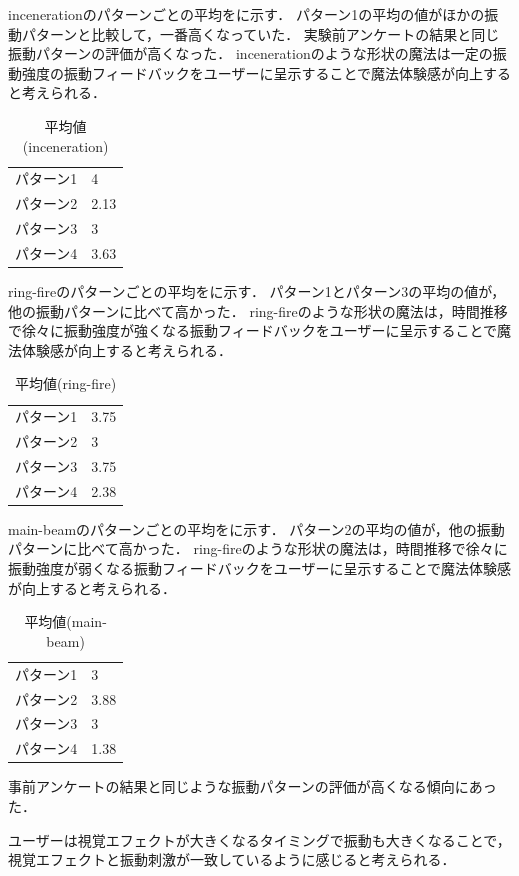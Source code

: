 incenerationのパターンごとの平均をに示す．
パターン1の平均の値がほかの振動パターンと比較して，一番高くなっていた．
実験前アンケートの結果と同じ振動パターンの評価が高くなった．
incenerationのような形状の魔法は一定の振動強度の振動フィードバックをユーザーに呈示することで魔法体験感が向上すると考えられる．

\begin{table}[h]
    \caption{平均値(inceneration)}
    \centering
    \begin{tabular}{l|l}
    \hline
    \hline
    パターン1 & 4\\
    パターン2 & 2.13\\
    パターン3 & 3\\
    パターン4 & 3.63\\
    \hline
    \end{tabular}
    \label{tab;inceAvera}
\end{table}

ring-fireのパターンごとの平均をに示す．
パターン1とパターン3の平均の値が，他の振動パターンに比べて高かった．
ring-fireのような形状の魔法は，時間推移で徐々に振動強度が強くなる振動フィードバックをユーザーに呈示することで魔法体験感が向上すると考えられる．

\begin{table}[h]
    \caption{平均値(ring-fire)}
    \centering
    \begin{tabular}{l|l}
    \hline
    \hline
    パターン1 & 3.75\\
    パターン2 & 3\\
    パターン3 & 3.75\\
    パターン4 & 2.38\\
    \hline
    \end{tabular}
    \label{tab;ringAve}
\end{table}

main-beamのパターンごとの平均をに示す．
パターン2の平均の値が，他の振動パターンに比べて高かった．
ring-fireのような形状の魔法は，時間推移で徐々に振動強度が弱くなる振動フィードバックをユーザーに呈示することで魔法体験感が向上すると考えられる．


  \begin{table}[H]
    \caption{平均値(main-beam)}
    \centering
    \begin{tabular}{l|l}
    \hline
    \hline
    パターン1 & 3\\
    パターン2 & 3.88\\
    パターン3 & 3\\
    パターン4 & 1.38\\
    \hline
    \end{tabular}
    \label{tab;mainAve}
\end{table}

事前アンケートの結果と同じような振動パターンの評価が高くなる傾向にあった．

ユーザーは視覚エフェクトが大きくなるタイミングで振動も大きくなることで，視覚エフェクトと振動刺激が一致しているように感じると考えられる．


